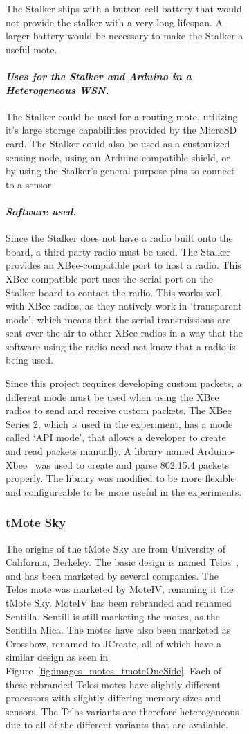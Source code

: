 \begin{figure}
\begin{figure}
    The Stalker ships with a button-cell battery that would not provide the stalker 
    with a very long lifespan. A larger battery would be necessary to make the Stalker 
    a useful mote.
		

	\paragraph{\emph{Uses for the Stalker and Arduino in a Heterogeneous WSN.}}
	
	The Stalker could be used for a routing mote, utilizing it's large
	storage capabilities provided by the MicroSD card. The Stalker could 
	also be used as a customized sensing node, using an Arduino-compatible 
	shield, or by using the Stalker's general purpose pins to connect to a sensor.
	
	\paragraph{\emph{Software used.}}
	
	Since the Stalker does not have a radio built onto the board, a third-party
	radio must be used. The Stalker provides an XBee-compatible port to host a radio.
	This XBee-compatible port uses the serial port on the Stalker board to contact the 
	radio. This works well with XBee radios, as they natively work in `transparent mode', which 
	means that the serial transmissions are sent over-the-air to other XBee radios
	in a way that the software using the radio need not know that a radio is being used.
	
	Since this project requires developing custom packets, a different mode must be used 
	when using the XBee radios to send and receive custom packets. The XBee Series 2, which
	is used in the experiment, has a mode called `API mode', that allows a developer to 
	create and read packets manually. A library named Arduino-Xbee~\cite{xbee-arduino} was 
	used to create and parse 802.15.4 packets properly. The library was modified to be
	more flexible and configureable to be more useful in the experiments.

\subsubsection {tMote Sky}
	The origins of the tMote Sky are from University of California, Berkeley. The basic 
	design is named Telos~\cite{telosOriginalPaper}, and has been marketed by several
	companies. The Telos mote was marketed by MoteIV, renaming it the tMote Sky.  
	MoteIV has been rebranded and renamed Sentilla. Sentill is still marketing the motes, as the Sentilla Mica.
	The motes have also been marketed as Crossbow, renamed to JCreate, all of which have a 
	similar design as seen in Figure~\ref{fig:images_motes_tmoteOneSide}.
	Each of these rebranded Telos motes have slightly different processors with 
	slightly differing memory sizes and sensors. The Telos variants are therefore 
	heterogeneous due to all of the different variants that are available.


\end{figure}
\end{figure}
